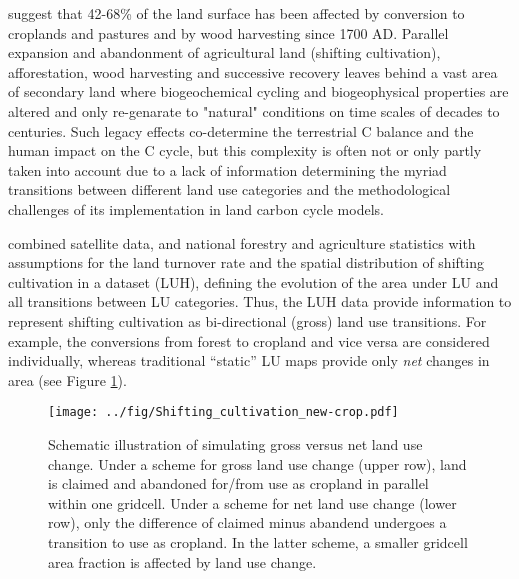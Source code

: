 \citet{hurtt06gcb} suggest that 42-68\% of the land surface has been affected by conversion to croplands and pastures and by wood harvesting since 1700 AD. Parallel expansion and abandonment of agricultural land (shifting cultivation), afforestation, wood harvesting and successive recovery leaves behind a vast area of secondary land where biogeochemical cycling and biogeophysical properties are altered and only re-genarate to "natural" conditions on time scales of decades to centuries. Such legacy effects co-determine the terrestrial C balance and the human impact on the C cycle, but this complexity is often not or only partly taken into account \citep{brovkin13jclim} due to a lack of information determining the myriad transitions between different land use categories and the methodological challenges of its implementation in land carbon cycle models. %

\citet{hurtt06gcb} combined satellite data, and national forestry and agriculture statistics with assumptions for the land turnover rate and the spatial distribution of shifting cultivation in a dataset (LUH), defining the evolution of the area under LU and all transitions between LU categories. Thus, the LUH data provide information to represent shifting cultivation as bi-directional (gross) land use transitions. For example, the conversions from forest to cropland and vice versa are considered individually, whereas traditional ``static'' LU maps provide only {\it net} changes in area (see Figure \ref{fig:schematic}).
\begin{figure}
\begin{center}
 \texttt{[image: ../fig/Shifting\_cultivation\_new-crop.pdf]}
 \caption[Schematic illustration of simulating gross versus net land use change]{Schematic illustration of simulating gross versus net land use change. Under a scheme for gross land use change (upper row), land is claimed and abandoned for/from use as cropland in parallel within one gridcell. Under a scheme for net land use change (lower row), only the difference of claimed minus abandend undergoes a transition to use as cropland. In the latter scheme, a smaller gridcell area fraction is affected by land use change.}
 \label{fig:schematic}
\end{center}
\end{figure}

